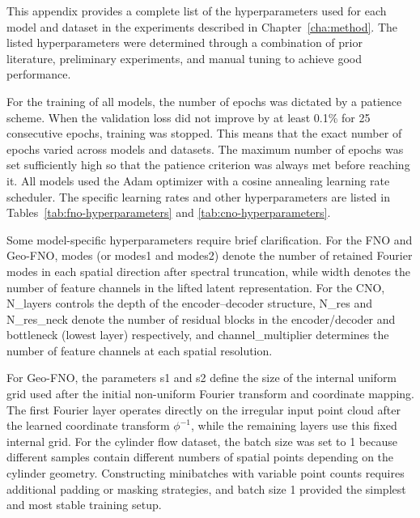 This appendix provides a complete list of the hyperparameters used for each model and dataset in the experiments described in Chapter~\ref{cha:method}. The listed hyperparameters were determined through a combination of prior literature, preliminary experiments, and manual tuning to achieve good performance.

For the training of all models, the number of epochs was dictated by a patience scheme. When the validation loss did not improve by at least 0.1\% for 25 consecutive epochs, training was stopped. This means that the exact number of epochs varied across models and datasets. The maximum number of epochs was set sufficiently high so that the patience criterion was always met before reaching it. All models used the Adam optimizer with a cosine annealing learning rate scheduler. The specific learning rates and other hyperparameters are listed in Tables~\ref{tab:fno-hyperparameters} and \ref{tab:cno-hyperparameters}.

Some model-specific hyperparameters require brief clarification. For the FNO and Geo-FNO, modes (or modes1 and modes2) denote the number of retained Fourier modes in each spatial direction after spectral truncation, while width denotes the number of feature channels in the lifted latent representation. For the CNO, N\_layers controls the depth of the encoder--decoder structure, N\_res and N\_res\_neck denote the number of residual blocks in the encoder/decoder and bottleneck (lowest layer) respectively, and channel\_multiplier determines the number of feature channels at each spatial resolution.

For Geo-FNO, the parameters s1 and s2 define the size of the internal uniform grid used after the initial non-uniform Fourier transform and coordinate mapping. The first Fourier layer operates directly on the irregular input point cloud after the learned coordinate transform $\phi^{-1}$, while the remaining layers use this fixed internal grid. For the cylinder flow dataset, the batch size was set to 1 because different samples contain different numbers of spatial points depending on the cylinder geometry. Constructing minibatches with variable point counts requires additional padding or masking strategies, and batch size 1 provided the simplest and most stable training setup.


